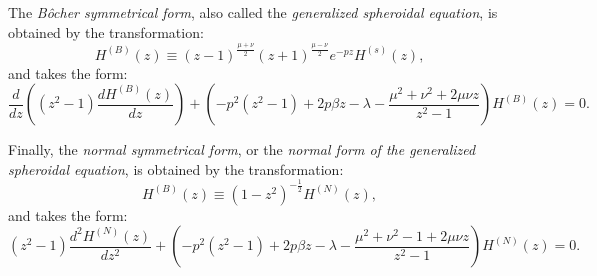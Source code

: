 \documentclass[11pt]{article}
\begin{document}
The {\em B\^{o}cher symmetrical form}, also called the {\em
  generalized spheroidal equation}, is obtained by the transformation:
\begin{equation}
  H^{(B)}(z)\equiv(z-1)^{\frac{\mu+\nu}2}(z+1)^{\frac{\mu-\nu}2}e^{-pz}H^{(s)}(z),
\end{equation}
and takes the form:
\begin{equation}
\frac{d}{dz}\left((z^2-1)\frac{dH^{(B)}(z)}{dz}\right)
+\left(-p^2(z^2-1)+2p\beta z-\lambda
    -\frac{\mu^2+\nu^2+2\mu\nu z}{z^2-1}\right)H^{(B)}(z)=0.
\end{equation}

Finally, the {\em normal symmetrical form}, or the {\em normal form of
the  generalized spheroidal equation}, is obtained by the transformation:
\begin{equation}
  H^{(B)}(z)\equiv(1-z^2)^{-\frac12}H^{(N)}(z),
\end{equation}
and takes the form:
\begin{equation}
(z^2-1)\frac{d^2H^{(N)}(z)}{dz^2}
+\left(-p^2(z^2-1)+2p\beta z-\lambda
    -\frac{\mu^2+\nu^2-1+2\mu\nu z}{z^2-1}\right)H^{(N)}(z)=0.
\end{equation}
\end{document}
